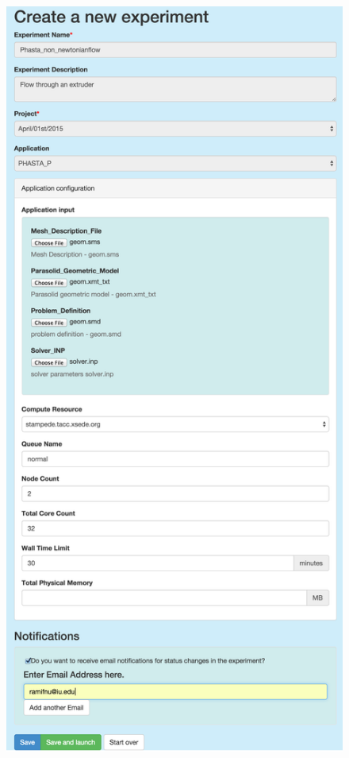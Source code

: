 \begin{figure} \centering
  \includegraphics[height=0.7\textheight,keepaspectratio]{figures/createExperiment.png}

\end{figure}
